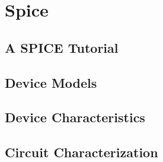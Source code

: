 \section{Spice}

\subsection{A SPICE Tutorial}

\subsection{Device Models}

\subsection{Device Characteristics}

\subsection{Circuit Characterization}
